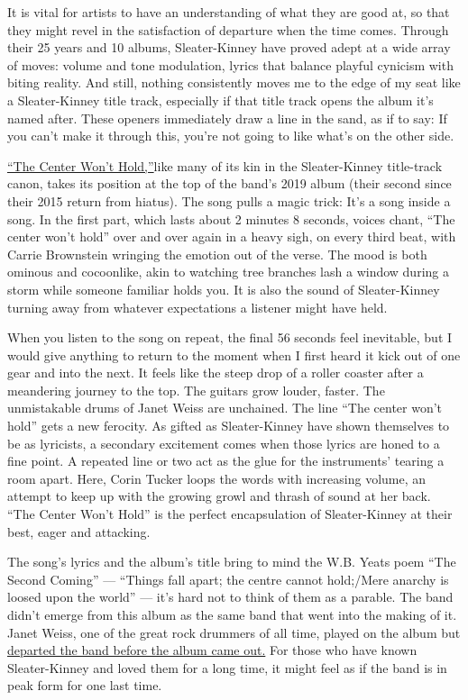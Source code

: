 It is vital for artists to have an understanding of what they are good
at, so that they might revel in the satisfaction of departure when the
time comes. Through their 25 years and 10 albums, Sleater-Kinney have
proved adept at a wide array of moves: volume and tone modulation,
lyrics that balance playful cynicism with biting reality. And still,
nothing consistently moves me to the edge of my seat like a
Sleater-Kinney title track, especially if that title track opens the
album it's named after. These openers immediately draw a line in the
sand, as if to say: If you can't make it through this, you're not going
to like what's on the other side.

\href{https://www.nytimes3xbfgragh.onion/2019/08/14/arts/music/sleater-kinney-the-center-wont-hold-review.html}{``The
Center Won't Hold,''}like many of its kin in the Sleater-Kinney
title-track canon, takes its position at the top of the band's 2019
album (their second since their 2015 return from hiatus). The song pulls
a magic trick: It's a song inside a song. In the first part, which lasts
about 2 minutes 8 seconds, voices chant, ``The center won't hold'' over
and over again in a heavy sigh, on every third beat, with Carrie
Brownstein wringing the emotion out of the verse. The mood is both
ominous and cocoonlike, akin to watching tree branches lash a window
during a storm while someone familiar holds you. It is also the sound of
Sleater-Kinney turning away from whatever expectations a listener might
have held.

When you listen to the song on repeat, the final 56 seconds feel
inevitable, but I would give anything to return to the moment when I
first heard it kick out of one gear and into the next. It feels like the
steep drop of a roller coaster after a meandering journey to the top.
The guitars grow louder, faster. The unmistakable drums of Janet Weiss
are unchained. The line ``The center won't hold'' gets a new ferocity.
As gifted as Sleater-Kinney have shown themselves to be as lyricists, a
secondary excitement comes when those lyrics are honed to a fine point.
A repeated line or two act as the glue for the instruments' tearing a
room apart. Here, Corin Tucker loops the words with increasing volume,
an attempt to keep up with the growing growl and thrash of sound at her
back. ``The Center Won't Hold'' is the perfect encapsulation of
Sleater-Kinney at their best, eager and attacking.

The song's lyrics and the album's title bring to mind the W.B. Yeats
poem ``The Second Coming'' --- ``Things fall apart; the centre cannot
hold;/Mere anarchy is loosed upon the world'' --- it's hard not to think
of them as a parable. The band didn't emerge from this album as the same
band that went into the making of it. Janet Weiss, one of the great rock
drummers of all time, played on the album but
\href{https://www.nytimes3xbfgragh.onion/2019/07/31/arts/music/sleater-kinney-st-vincent.html}{departed
the band before the album came out.} For those who have known
Sleater-Kinney and loved them for a long time, it might feel as if the
band is in peak form for one last time.

